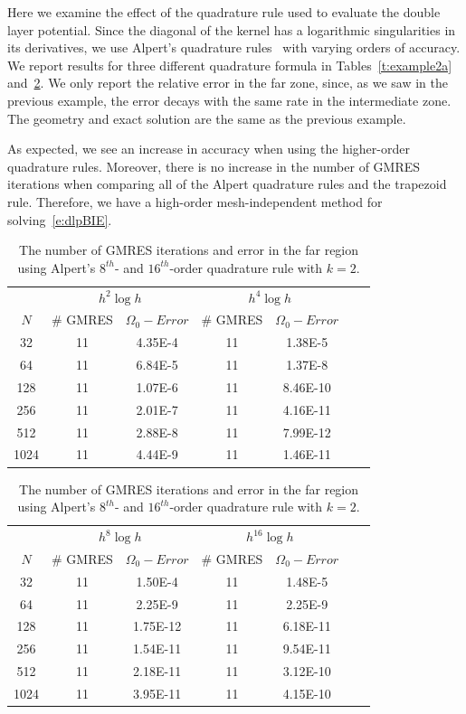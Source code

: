 \documentclass[final]{siamltex}
\begin{document}
Here we examine the effect of the quadrature rule used to evaluate the
double layer potential.  Since the diagonal of the kernel has a
logarithmic singularities in its derivatives, we use Alpert's quadrature
rules~\cite{alpert} with varying orders of accuracy.  We report results
for three different quadrature formula in Tables~\ref{t:example2a}
and~\ref{t:example2b}.  We only report the relative error in the far
zone, since, as we saw in the previous example, the error decays with
the same rate in the intermediate zone.  The geometry and exact solution
are the same as the previous example.

As expected, we see an increase in accuracy when using the higher-order
quadrature rules.  Moreover, there is no increase in the number of GMRES
iterations when comparing all of the Alpert quadrature rules and the
trapezoid rule.  Therefore, we have a high-order mesh-independent method
for solving~\eqref{e:dlpBIE}.

\begin{table}[htps]
\centering
\begin{tabular}{c|cc|cc|cc}
\multicolumn{1}{c|}{} &
\multicolumn{2}{c|}{$h^{2}\log h$} &
\multicolumn{2}{c}{$h^{4}\log h$} \\
$N$  & \# GMRES & $\Omega_{0}-Error$  
     & \# GMRES & $\Omega_{0}-Error$ \\
\hline
32   & 11 & 4.35E-4 & 11 & 1.38E-5  \\
64   & 11 & 6.84E-5 & 11 & 1.37E-8  \\
128  & 11 & 1.07E-6 & 11 & 8.46E-10 \\
256  & 11 & 2.01E-7 & 11 & 4.16E-11 \\
512  & 11 & 2.88E-8 & 11 & 7.99E-12 \\
1024 & 11 & 4.44E-9 & 11 & 1.46E-11 \\
\end{tabular}
\caption{\label{t:example2a} The number of GMRES iterations and error in
the far region using Alpert's $2^{nd}$- and $4^{th}$-order quadrature
rule with $k=2$.}

\begin{tabular}{c|cc|cc|cc}
\multicolumn{1}{c|}{} &
\multicolumn{2}{c|}{$h^{8}\log h$} &
\multicolumn{2}{c}{$h^{16}\log h$} \\
$N$  & \# GMRES & $\Omega_{0}-Error$  
     & \# GMRES & $\Omega_{0}-Error$ \\
\hline
32   & 11 & 1.50E-4  & 11 & 1.48E-5  \\
64   & 11 & 2.25E-9  & 11 & 2.25E-9  \\
128  & 11 & 1.75E-12 & 11 & 6.18E-11 \\
256  & 11 & 1.54E-11 & 11 & 9.54E-11 \\
512  & 11 & 2.18E-11 & 11 & 3.12E-10 \\
1024 & 11 & 3.95E-11 & 11 & 4.15E-10 \\
\end{tabular}
\caption{\label{t:example2b} The number of GMRES iterations and error in
the far region using Alpert's $8^{th}$- and $16^{th}$-order quadrature
rule with $k=2$.}

\end{table}
\end{document}
